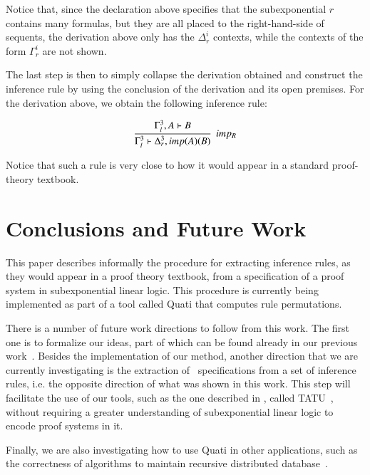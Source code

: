 \documentclass{ebl}
\begin{document}
Notice that, since the declaration above specifies that the subexponential $r$ contains
many formulas, but they are all placed to the right-hand-side of sequents, the derivation 
above only has the $\Delta_r^i$ contexts, while the contexts of the form $\Gamma_r^i$ are not
shown.

The last step is then to simply collapse the derivation obtained and construct the 
inference rule by using the conclusion of the derivation and its open premises. 
For the derivation above, we obtain the following inference rule:

{\small \[\cfrac{\Gamma_{l}^{3}, A  \vdash B }
{\Gamma_{l}^{3}  \vdash \Delta_{r}^{3}, imp (A) (B)  } \;\; imp_{R}\]}

Notice that such a rule is very close to how it would appear in a standard proof-theory 
textbook.

\section{Conclusions and Future Work}

This paper describes informally the procedure for extracting inference rules, as
they would appear in a proof theory textbook, from a specification of a proof system in 
subexponential linear logic. This procedure is currently being implemented
as part of a tool called Quati that computes rule permutations.

There is a number of future work directions to follow from this work. The first one is to 
formalize our ideas, part of which can be found already in our previous
work~\cite{nigam13iclp}. Besides the implementation of our method, another
direction that we are currently investigating is the extraction of \sell\
specifications from a set of inference rules, i.e. the opposite direction of
what was shown in this work. This step will facilitate the use of our tools, such as the one described
in \cite{nigam.jlc}, called TATU~\cite{tatu}, without requiring a greater
understanding of subexponential linear logic to encode proof systems in it.

Finally, we are also investigating how to use Quati in other applications, such as
the correctness of algorithms to maintain recursive distributed database~\cite{nigam12comlan}.



\end{document}
